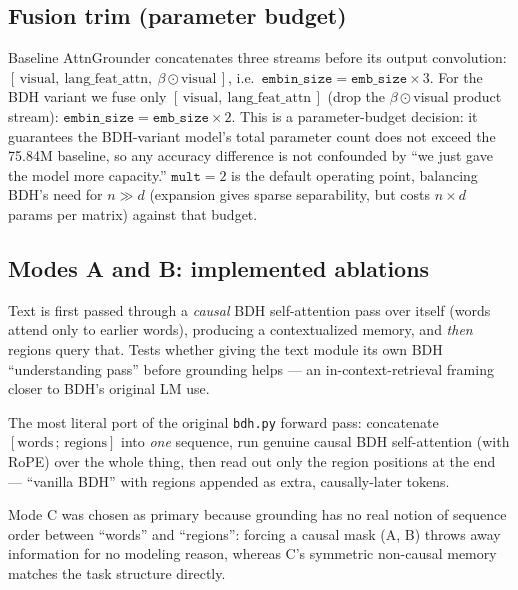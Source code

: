 \documentclass[11pt]{article}
\begin{document}
\subsection{Fusion trim (parameter budget)}

Baseline AttnGrounder concatenates three streams before its output convolution:
$[\,\text{visual},\ \text{lang\_feat\_attn},\ \beta \odot \text{visual}\,]$, i.e.\
$\texttt{embin\_size} = \texttt{emb\_size} \times 3$. For the BDH variant we fuse
only $[\,\text{visual},\ \text{lang\_feat\_attn}\,]$ (drop the $\beta\odot$visual
product stream): $\texttt{embin\_size} = \texttt{emb\_size} \times 2$. This is a
parameter-budget decision: it guarantees the BDH-variant model's total parameter
count does not exceed the 75.84M baseline, so any accuracy difference is not
confounded by ``we just gave the model more capacity.'' $\texttt{mult}=2$ is the
default operating point, balancing BDH's need for $n \gg d$ (expansion gives sparse
separability, but costs $n{\times}d$ params per matrix) against that budget.

\subsection{Modes A and B: implemented ablations}

\begin{description}[leftmargin=1.6em, style=nextline]
  \item[Mode A] Text is first passed through a \emph{causal} BDH self-attention
    pass over itself (words attend only to earlier words), producing a
    contextualized memory, and \emph{then} regions query that. Tests whether
    giving the text module its own BDH ``understanding pass'' before grounding
    helps --- an in-context-retrieval framing closer to BDH's original LM use.
  \item[Mode B] The most literal port of the original \texttt{bdh.py} forward
    pass: concatenate $[\text{words} \,;\, \text{regions}]$ into \emph{one}
    sequence, run genuine causal BDH self-attention (with RoPE) over the whole
    thing, then read out only the region positions at the end --- ``vanilla BDH''
    with regions appended as extra, causally-later tokens.
\end{description}

Mode C was chosen as primary because grounding has no real notion of sequence
order between ``words'' and ``regions'': forcing a causal mask (A, B) throws away
information for no modeling reason, whereas C's symmetric non-causal memory
matches the task structure directly.
\end{document}
